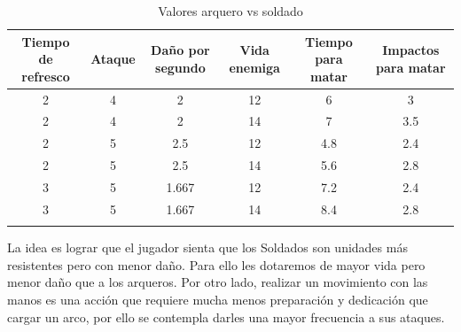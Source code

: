 \begin{longtable}[c]{|c|c|c|c|c|c|}
\hline
\multicolumn{1}{|m{1.8cm}|}{Tiempo de refresco} & \multicolumn{1}{m{1.2cm}|}{Ataque}             &
\multicolumn{1}{m{1.7cm}|}{Daño por segundo}   & \multicolumn{1}{m{1.4cm}|}{Vida enemiga}        &
\multicolumn{1}{m{1.2cm}|}{Tiempo para matar}  & \multicolumn{1}{m{1.45cm}|}{Impactos para matar}\\
\hline
\hline
\endhead
\multicolumn{1}{|S|}{2} & \multicolumn{1}{S|}{4} & \multicolumn{1}{S|}{2} & 
\multicolumn{1}{S|}{12} & \multicolumn{1}{S|}{6} & \multicolumn{1}{S|}{3} \\
\hline
\multicolumn{1}{|S|}{2} & \multicolumn{1}{S|}{4} & \multicolumn{1}{S|}{2}   & 
\multicolumn{1}{S|}{14} & \multicolumn{1}{S|}{7} & \multicolumn{1}{S|}{3.5} \\ 
\hline
\multicolumn{1}{|S|}{2} & \multicolumn{1}{S|}{5}   & \multicolumn{1}{S|}{2.5} & 
\multicolumn{1}{S|}{12} & \multicolumn{1}{S|}{4.8} & \multicolumn{1}{S|}{2.4} \\ 
\hline
\multicolumn{1}{|S|}{2} & \multicolumn{1}{S|}{5}   & \multicolumn{1}{S|}{2.5} & 
\multicolumn{1}{S|}{14} & \multicolumn{1}{S|}{5.6} & \multicolumn{1}{S|}{2.8} \\
\hline
\multicolumn{1}{|S|}{3} & \multicolumn{1}{S|}{5}   & \multicolumn{1}{S|}{1.667} & 
\multicolumn{1}{S|}{12} & \multicolumn{1}{S|}{7.2} & \multicolumn{1}{S|}{2.4}   \\
\hline
\multicolumn{1}{|S|}{3} & \multicolumn{1}{S|}{5}   & \multicolumn{1}{S|}{1.667} & 
\multicolumn{1}{S|}{14} & \multicolumn{1}{S|}{8.4} & \multicolumn{1}{S|}{2.8}   \\
\hline
\caption{Valores arquero vs soldado}
\end{longtable}

La idea es lograr que el jugador sienta que los Soldados son unidades más resistentes pero con menor
daño. Para ello les dotaremos de mayor vida pero menor daño que a los arqueros. Por otro lado, realizar
un movimiento con las manos es una acción que requiere mucha menos preparación y dedicación que cargar 
un arco, por ello se contempla darles una mayor frecuencia a sus ataques.

